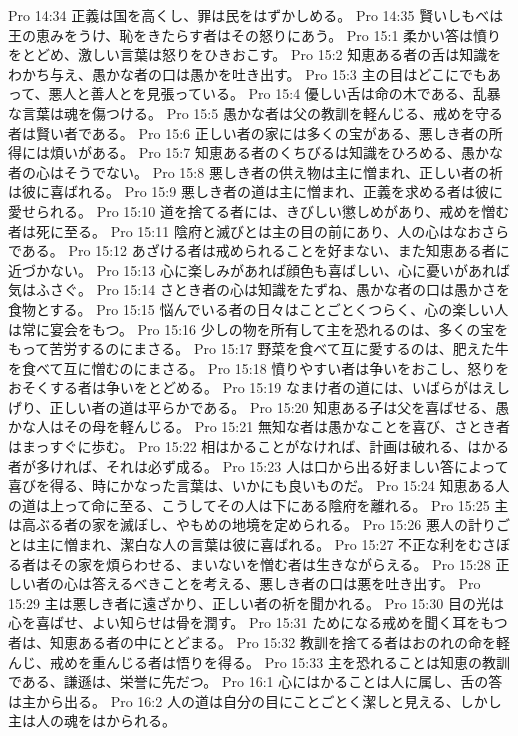 Pro 14:34  正義は国を高くし、罪は民をはずかしめる。
Pro 14:35  賢いしもべは王の恵みをうけ、恥をきたらす者はその怒りにあう。
Pro 15:1  柔かい答は憤りをとどめ、激しい言葉は怒りをひきおこす。
Pro 15:2  知恵ある者の舌は知識をわかち与え、愚かな者の口は愚かを吐き出す。
Pro 15:3  主の目はどこにでもあって、悪人と善人とを見張っている。
Pro 15:4  優しい舌は命の木である、乱暴な言葉は魂を傷つける。
Pro 15:5  愚かな者は父の教訓を軽んじる、戒めを守る者は賢い者である。
Pro 15:6  正しい者の家には多くの宝がある、悪しき者の所得には煩いがある。
Pro 15:7  知恵ある者のくちびるは知識をひろめる、愚かな者の心はそうでない。
Pro 15:8  悪しき者の供え物は主に憎まれ、正しい者の祈は彼に喜ばれる。
Pro 15:9  悪しき者の道は主に憎まれ、正義を求める者は彼に愛せられる。
Pro 15:10  道を捨てる者には、きびしい懲しめがあり、戒めを憎む者は死に至る。
Pro 15:11  陰府と滅びとは主の目の前にあり、人の心はなおさらである。
Pro 15:12  あざける者は戒められることを好まない、また知恵ある者に近づかない。
Pro 15:13  心に楽しみがあれば顔色も喜ばしい、心に憂いがあれば気はふさぐ。
Pro 15:14  さとき者の心は知識をたずね、愚かな者の口は愚かさを食物とする。
Pro 15:15  悩んでいる者の日々はことごとくつらく、心の楽しい人は常に宴会をもつ。
Pro 15:16  少しの物を所有して主を恐れるのは、多くの宝をもって苦労するのにまさる。
Pro 15:17  野菜を食べて互に愛するのは、肥えた牛を食べて互に憎むのにまさる。
Pro 15:18  憤りやすい者は争いをおこし、怒りをおそくする者は争いをとどめる。
Pro 15:19  なまけ者の道には、いばらがはえしげり、正しい者の道は平らかである。
Pro 15:20  知恵ある子は父を喜ばせる、愚かな人はその母を軽んじる。
Pro 15:21  無知な者は愚かなことを喜び、さとき者はまっすぐに歩む。
Pro 15:22  相はかることがなければ、計画は破れる、はかる者が多ければ、それは必ず成る。
Pro 15:23  人は口から出る好ましい答によって喜びを得る、時にかなった言葉は、いかにも良いものだ。
Pro 15:24  知恵ある人の道は上って命に至る、こうしてその人は下にある陰府を離れる。
Pro 15:25  主は高ぶる者の家を滅ぼし、やもめの地境を定められる。
Pro 15:26  悪人の計りごとは主に憎まれ、潔白な人の言葉は彼に喜ばれる。
Pro 15:27  不正な利をむさぼる者はその家を煩らわせる、まいないを憎む者は生きながらえる。
Pro 15:28  正しい者の心は答えるべきことを考える、悪しき者の口は悪を吐き出す。
Pro 15:29  主は悪しき者に遠ざかり、正しい者の祈を聞かれる。
Pro 15:30  目の光は心を喜ばせ、よい知らせは骨を潤す。
Pro 15:31  ためになる戒めを聞く耳をもつ者は、知恵ある者の中にとどまる。
Pro 15:32  教訓を捨てる者はおのれの命を軽んじ、戒めを重んじる者は悟りを得る。
Pro 15:33  主を恐れることは知恵の教訓である、謙遜は、栄誉に先だつ。
Pro 16:1  心にはかることは人に属し、舌の答は主から出る。
Pro 16:2  人の道は自分の目にことごとく潔しと見える、しかし主は人の魂をはかられる。
